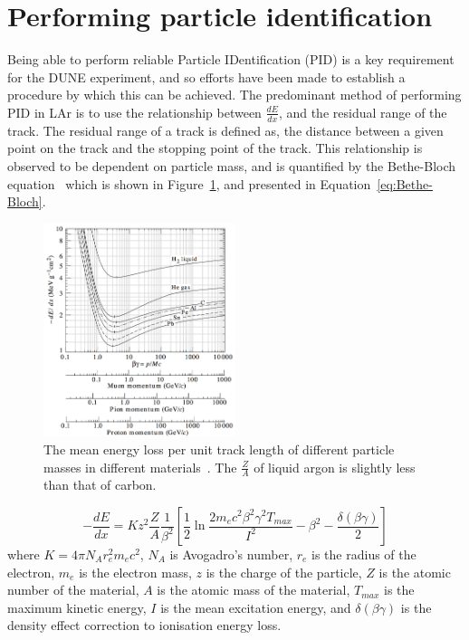 \section{Performing particle identification}  \label{sec:PID} %
Being able to perform reliable Particle IDentification (PID) is a key requirement for the DUNE experiment, and so efforts have been made to establish a procedure by which this can be achieved. The predominant method of performing PID in LAr is to use the relationship between $\frac{dE}{dx}$, and the residual range of the track. The residual range of a track is defined as, the distance between a given point on the track and the stopping point of the track. This relationship is observed to be dependent on particle mass, and is quantified by the Bethe-Bloch equation~\citep{Bethe, Bloch} which is shown in Figure~\ref{fig:BetheBloch}, and presented in Equation~\ref{eq:Bethe-Bloch}. \\

\begin{figure}
  \centering
  \includegraphics[width=0.5\textwidth]{Bethe-Bloch}
  \caption[The mean energy loss per unit track length of different particle masses in different materials]
          {The mean energy loss per unit track length of different particle masses in different materials~\citep{PDGReview}. The $\frac{Z}{A}$ of liquid argon is slightly less than that of carbon.}
  \label{fig:BetheBloch}
\end{figure}

\begin{equation}
  \label{eq:Bethe-Bloch}
  -\frac{dE}{dx} = K z^2 \frac{Z}{A} \frac{1}{\beta^2} \left[ \frac{1}{2} \ln{\frac{2 m_e c^2 \beta^2 \gamma^2 T_{max}}{I^2}} - \beta^2 - \frac{\delta(\beta\gamma)}{2}\right]
\end{equation}
where $K = 4 \pi N_A r_{e}^{2} m_e c^2$, $N_A$ is Avogadro's number, $r_e$ is the radius of the electron, $m_e$ is the electron mass, $z$ is the charge of the particle, $Z$ is the atomic number of the material, $A$ is the atomic mass of the material, $T_{max}$ is the maximum kinetic energy, $I$ is the mean excitation energy, and $\delta(\beta\gamma)$ is the density effect correction to ionisation energy loss. \\

